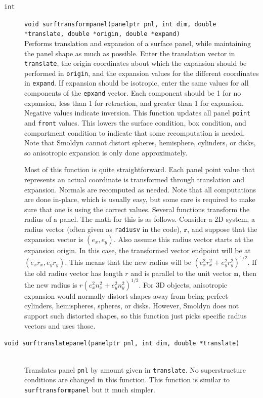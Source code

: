 \documentclass {scrbook}
\newcommand {\ttt} {\texttt}
\begin{document}
\begin{description}
\item[\ttt{int}]
\ttt{void surftransformpanel(panelptr pnl, int dim, double *translate, double *origin, double *expand)}
\hfill \\
Performs translation and expansion of a surface panel, while maintaining the panel shape as much as possible. Enter the translation vector in \ttt{translate}, the origin coordinates about which the expansion should be performed in \ttt{origin}, and the expansion values for the different coordinates in \ttt{expand}. If expansion should be isotropic, enter the same values for all components of the \ttt{epxand} vector. Each component should be 1 for no expansion, less than 1 for retraction, and greater than 1 for expansion. Negative values indicate inversion. This function updates all panel \ttt{point} and \ttt{front} values. This lowers the surface condition, box condition, and compartment condition to indicate that some recomputation is needed. Note that Smoldyn cannot distort spheres, hemisphere, cylinders, or disks, so anisotropic expansion is only done approximately.

Most of this function is quite straightforward. Each panel point value that represents an actual coordinate is transformed through translation and expansion. Normals are recomputed as needed. Note that all computations are done in-place, which is usually easy, but some care is required to make sure that one is using the correct values. Several functions transform the radius of a panel. The math for this is as follows. Consider a 2D system, a radius vector (often given as \ttt{radiusv} in the code), $\bm{r}$, and suppose that the expansion vector is $(e_x, e_y)$. Also assume this radius vector starts at the expansion origin. In this case, the transformed vector endpoint will be at $(e_x r_x, e_y r_y)$. This means that the new radius will be $(e_x^2r_x^2+e_y^2r_y^2)^{1/2}$. If the old radius vector has length $r$ and is parallel to the unit vector $\bm{n}$, then the new radius is $r(e_x^2n_x^2+e_y^2n_y^2)^{1/2}$. For 3D objects, anisotropic expansion would normally distort shapes away from being perfect cylinders, hemispheres, spheres, or disks. However, Smoldyn does not support such distorted shapes, so this function just picks specific radius vectors and uses those.

\item[\ttt{void surftranslatepanel(panelptr pnl, int dim, double *translate)}]
\hfill \\
Translates panel \ttt{pnl} by amount given in \ttt{translate}. No superstructure conditions are changed in this function. This function is similar to \ttt{surftransformpanel} but it much simpler.


\end{description}
\end{document}
